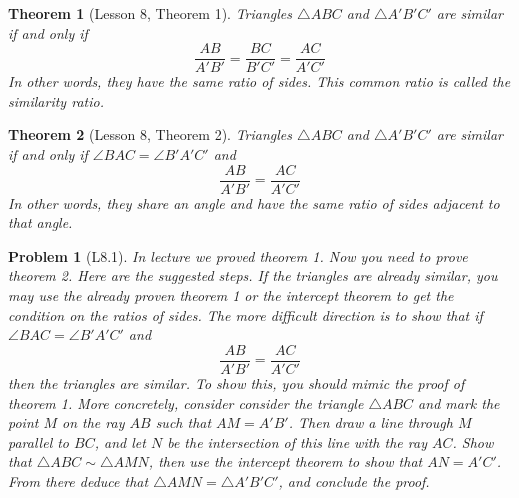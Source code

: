 \documentclass[a4paper,12pt]{article}
\theoremstyle{perfect}
\newtheorem{thm}{Theorem}
\newtheorem{prb}{Problem}
\begin{document}
\begin{thm}[Lesson 8, Theorem 1]
Triangles $\triangle ABC$ and $\triangle A'B'C'$ are similar if and only if $$\frac{AB}{A'B'} = \frac{BC}{B'C'} = \frac{AC}{A'C'}$$
In other words, they have the same ratio of sides. This common ratio is called the \textit{similarity ratio}.
\end{thm}
\begin{thm}[Lesson 8, Theorem 2]
Triangles $\triangle ABC$ and $\triangle A'B'C'$ are similar if and only if $\angle BAC = \angle B'A'C'$ and $$\frac{AB}{A'B'} = \frac{AC}{A'C'}$$
In other words, they share an angle and have the same ratio of sides adjacent to that angle.
\end{thm}
\begin{prb}[L8.1]
In lecture we proved theorem 1. Now you need to prove theorem 2. Here are the suggested steps. If the triangles are already similar, you may use the already proven theorem 1 or the intercept theorem to get the condition on the ratios of sides. The more difficult direction is to show that if $\angle BAC = \angle B'A'C'$ and $$\frac{AB}{A'B'} = \frac{AC}{A'C'}$$ then the triangles are similar. To show this, you should mimic the proof of theorem 1. More concretely, consider consider the triangle $\triangle ABC$ and mark the point $M$ on the ray $AB$ such that $AM = A'B'$. Then draw a line through $M$ parallel to $BC$, and let $N$ be the intersection of this line with the ray $AC$. Show that $\triangle ABC \sim \triangle AMN$, then use the intercept theorem to show that $AN = A'C'$. From there deduce that $\triangle AMN = \triangle A'B'C'$, and conclude the proof.
\end{prb}
\end{document}
